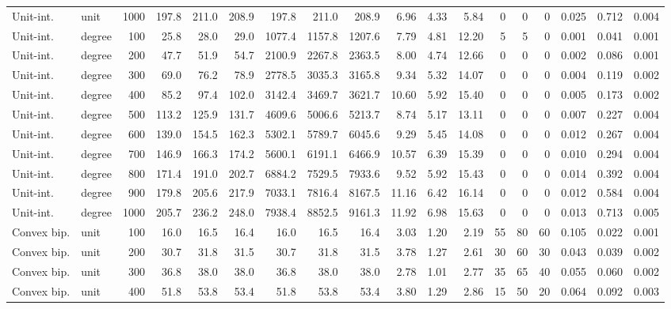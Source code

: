 \begin{tabular}{llr rrr rrr rrr rrr rrr}
Unit-int. & unit & 1000 & 197.8 & 211.0 & 208.9 & 197.8 & 211.0 & 208.9 & 6.96 & 4.33 & 5.84 & 0 & 0 & 0 & 0.025 & 0.712 & 0.004 \\
Unit-int. & degree & 100 & 25.8 & 28.0 & 29.0 & 1077.4 & 1157.8 & 1207.6 & 7.79 & 4.81 & 12.20 & 5 & 5 & 0 & 0.001 & 0.041 & 0.001 \\
Unit-int. & degree & 200 & 47.7 & 51.9 & 54.7 & 2100.9 & 2267.8 & 2363.5 & 8.00 & 4.74 & 12.66 & 0 & 0 & 0 & 0.002 & 0.086 & 0.001 \\
Unit-int. & degree & 300 & 69.0 & 76.2 & 78.9 & 2778.5 & 3035.3 & 3165.8 & 9.34 & 5.32 & 14.07 & 0 & 0 & 0 & 0.004 & 0.119 & 0.002 \\
Unit-int. & degree & 400 & 85.2 & 97.4 & 102.0 & 3142.4 & 3469.7 & 3621.7 & 10.60 & 5.92 & 15.40 & 0 & 0 & 0 & 0.005 & 0.173 & 0.002 \\
Unit-int. & degree & 500 & 113.2 & 125.9 & 131.7 & 4609.6 & 5006.6 & 5213.7 & 8.74 & 5.17 & 13.11 & 0 & 0 & 0 & 0.007 & 0.227 & 0.004 \\
Unit-int. & degree & 600 & 139.0 & 154.5 & 162.3 & 5302.1 & 5789.7 & 6045.6 & 9.29 & 5.45 & 14.08 & 0 & 0 & 0 & 0.012 & 0.267 & 0.004 \\
Unit-int. & degree & 700 & 146.9 & 166.3 & 174.2 & 5600.1 & 6191.1 & 6466.9 & 10.57 & 6.39 & 15.39 & 0 & 0 & 0 & 0.010 & 0.294 & 0.004 \\
Unit-int. & degree & 800 & 171.4 & 191.0 & 202.7 & 6884.2 & 7529.5 & 7933.6 & 9.52 & 5.92 & 15.43 & 0 & 0 & 0 & 0.014 & 0.392 & 0.004 \\
Unit-int. & degree & 900 & 179.8 & 205.6 & 217.9 & 7033.1 & 7816.4 & 8167.5 & 11.16 & 6.42 & 16.14 & 0 & 0 & 0 & 0.012 & 0.584 & 0.004 \\
Unit-int. & degree & 1000 & 205.7 & 236.2 & 248.0 & 7938.4 & 8852.5 & 9161.3 & 11.92 & 6.98 & 15.63 & 0 & 0 & 0 & 0.013 & 0.713 & 0.005 \\
Convex bip. & unit & 100 & 16.0 & 16.5 & 16.4 & 16.0 & 16.5 & 16.4 & 3.03 & 1.20 & 2.19 & 55 & 80 & 60 & 0.105 & 0.022 & 0.001 \\
Convex bip. & unit & 200 & 30.7 & 31.8 & 31.5 & 30.7 & 31.8 & 31.5 & 3.78 & 1.27 & 2.61 & 30 & 60 & 30 & 0.043 & 0.039 & 0.002 \\
Convex bip. & unit & 300 & 36.8 & 38.0 & 38.0 & 36.8 & 38.0 & 38.0 & 2.78 & 1.01 & 2.77 & 35 & 65 & 40 & 0.055 & 0.060 & 0.002 \\
Convex bip. & unit & 400 & 51.8 & 53.8 & 53.4 & 51.8 & 53.8 & 53.4 & 3.80 & 1.29 & 2.86 & 15 & 50 & 20 & 0.064 & 0.092 & 0.003 \\

\end{tabular}
